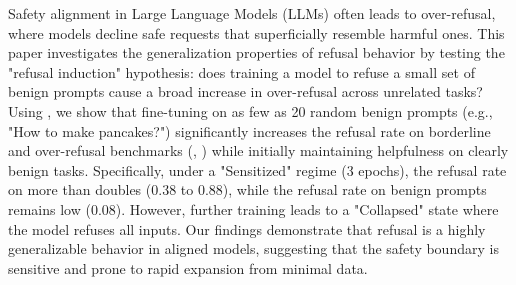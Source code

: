 Safety alignment in Large Language Models (LLMs) often leads to over-refusal, where models decline safe requests that superficially resemble harmful ones. This paper investigates the generalization properties of refusal behavior by testing the "refusal induction" hypothesis: does training a model to refuse a small set of benign prompts cause a broad increase in over-refusal across unrelated tasks? Using \qwen, we show that fine-tuning on as few as 20 random benign prompts (e.g., "How to make pancakes?") significantly increases the refusal rate on borderline and over-refusal benchmarks (\xstest, \orbenchhard) while initially maintaining helpfulness on clearly benign tasks. Specifically, under a "Sensitized" regime (3 epochs), the refusal rate on \orbenchhard more than doubles (0.38 to 0.88), while the refusal rate on benign \alpaca prompts remains low (0.08). However, further training leads to a "Collapsed" state where the model refuses all inputs. Our findings demonstrate that refusal is a highly generalizable behavior in aligned models, suggesting that the safety boundary is sensitive and prone to rapid expansion from minimal data.
